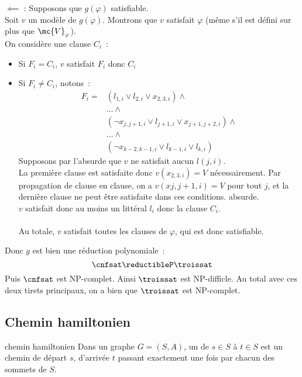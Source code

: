 \begin{demonstration} 
    $\boxed{\impliedby}$ : Supposons que $g(\varphi)$ satisfiable.\\
    Soit $v$ un modèle de $g(\varphi)$. Montrons que $v$ satisfait $\varphi$ (même s'il est défini sur plus que $\mc{V}_\varphi$).\\
    On considère une clause $C_i$~:
    \begin{itemize}
        \item Si $F_i = C_i$, $v$ satisfait $F_i$ donc $C_i$
        \item Si $F_i \neq C_i$, notons~:
        \begin{align*}
            F_i =& (l_{1,i} \vee l_{2,i} \vee x_{2,3,i}) \wedge \\
                &\dots \wedge\\
                & (\lnot x_{j, j+1,i} \vee l_{j+1,i} \vee x_{j+1,j+2,i}) \wedge\\
                &\dots \wedge\\
                & (\lnot x_{k-2, k-1,i} \vee l_{k-1,i} \vee l_{k,i})
        \end{align*}
        Supposons par l'absurde que $v$ ne satisfait aucun $l(j,i)$.\\
        La première clause est satisfaite donc $v(x_{2,3,i}) = V$ nécessairement. Par propagation de clause en clause, on a $v(x{j,j+1,i}) = V$ pour tout $j$, et la dernière clause ne peut être satisfaite dans ces conditions. absurde.\\
        $v$ satisfait donc au moins un littéral $l_i$ donc la clause $C_i$.\\\\
        Au totale, $v$ satisfait toutes les clauses de $\varphi$, qui est donc satisfiable.\\
    \end{itemize}
    Donc $g$ est bien une réduction polynomiale~:
    $$\cnfsat \reductibleP \troissat$$
    Puis $\cnfsat$ est NP-complet. Ainsi $\troissat$ est NP-difficle.
    Au total avec ces deux tirets principaux, on a bien que $\troissat$ est NP-complet.
\end{demonstration}

\subsection{Chemin hamiltonien}

\begin{definition}{}{chemin hamiltonien}
    Dans un graphe $G = (S,A)$, un  de $s\in S$ à $t \in S$ est un chemin de départ $s$, d'arrivée $t$ passant exactement une fois par chacun des sommets de $S$.
\end{definition}

